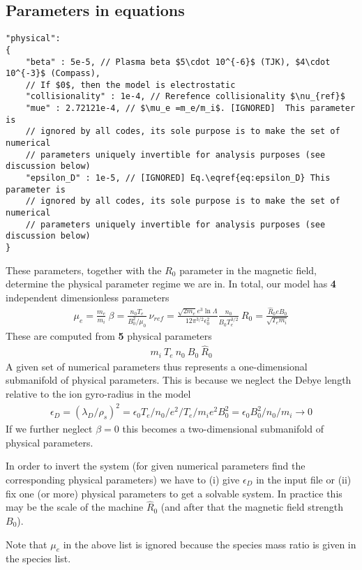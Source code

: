 \subsection{Parameters in equations} \label{sec:physical}
\begin{verbatim}
"physical":
{
    "beta" : 5e-5, // Plasma beta $5\cdot 10^{-6}$ (TJK), $4\cdot 10^{-3}$ (Compass),
    // If $0$, then the model is electrostatic
    "collisionality" : 1e-4, // Rerefence collisionality $\nu_{ref}$
    "mue" : 2.72121e-4, // $\mu_e =m_e/m_i$. [IGNORED]  This parameter is
    // ignored by all codes, its sole purpose is to make the set of numerical
    // parameters uniquely invertible for analysis purposes (see discussion below)
    "epsilon_D" : 1e-5, // [IGNORED] Eq.\eqref{eq:epsilon_D} This parameter is
    // ignored by all codes, its sole purpose is to make the set of numerical
    // parameters uniquely invertible for analysis purposes (see discussion below)
}
\end{verbatim}
These parameters, together with the $R_0$ parameter in the magnetic field,
determine the physical parameter regime we are in.
In total, our model has \textbf{4} independent dimensionless parameters
\begin{align*}
    \mu_e = \frac{m_e}{m_i}\ \beta =
    \frac{n_0T_{e}}{B_0^2/\mu_0}\ \nu_{ref} = \frac{\sqrt{2m_e} e^3 \ln
    \Lambda} {12\pi^{3/2} \epsilon_0^2} \frac{n_0} {B_0T_e^{3/2}} \ R_0
    = \frac{\hat R_0 e B_0}{\sqrt{T_{e}m_i}}
\end{align*}
These are computed from \textbf{5} physical parameters
\begin{align*}
    m_i\ T_e\ n_0\ B_0\ \hat R_0
\end{align*}
 A given set of numerical parameters thus represents a one-dimensional
 submanifold of physical parameters.
 This is because we neglect the Debye length relative to the ion gyro-radius
 in the model
 \begin{align}\label{eq:epsilon_D}
     \epsilon_D = (\lambda_D/\rho_s)^2 = \epsilon_0 T_e /n_0 /e^2 / T_e/m_i e^2 B_0^2 = \epsilon_0 B_0^2/n_0 /m_i \rightarrow 0
 \end{align}
If we further neglect $\beta=0$ this becomes a two-dimensional submanifold
of physical parameters.
\begin{tcolorbox}[title=Note]
    In order to invert the system (for given numerical parameters find the
    corresponding physical parameters) we have to (i) give $\epsilon_D$ in the
    input file or (ii) fix one (or more) physical
    parameters to get a solvable system.  In practice this may be the scale of
    the machine $\hat R_0$ (and after that the magnetic field strength $B_0$).

    Note that $\mu_e$ in the above list is ignored because the species mass ratio is given
    in the species list.
\end{tcolorbox}
